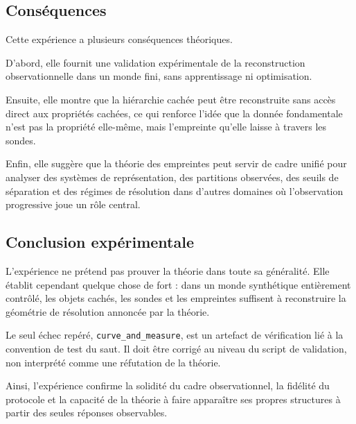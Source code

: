 \documentclass[11pt,a4paper]{article}
\begin{document}
\begin{appendices}
\subsection{Conséquences}

Cette expérience a plusieurs conséquences théoriques.

D'abord, elle fournit une validation expérimentale de la reconstruction observationnelle dans un monde fini, sans apprentissage ni optimisation.

Ensuite, elle montre que la hiérarchie cachée peut être reconstruite sans accès direct aux propriétés cachées, ce qui renforce l'idée que la donnée fondamentale n'est pas la propriété elle-même, mais l'empreinte qu'elle laisse à travers les sondes.

Enfin, elle suggère que la théorie des empreintes peut servir de cadre unifié pour analyser des systèmes de représentation, des partitions observées, des seuils de séparation et des régimes de résolution dans d'autres domaines où l'observation progressive joue un rôle central.

\subsection{Conclusion expérimentale}

L'expérience ne prétend pas prouver la théorie dans toute sa généralité. Elle établit cependant quelque chose de fort : dans un monde synthétique entièrement contrôlé, les objets cachés, les sondes et les empreintes suffisent à reconstruire la géométrie de résolution annoncée par la théorie.

Le seul échec repéré, \texttt{curve\_and\_measure}, est un artefact de vérification lié à la convention de test du saut. Il doit être corrigé au niveau du script de validation, non interprété comme une réfutation de la théorie.

Ainsi, l'expérience confirme la solidité du cadre observationnel, la fidélité du protocole et la capacité de la théorie à faire apparaître ses propres structures à partir des seules réponses observables.


















\end{appendices}
\end{document}
